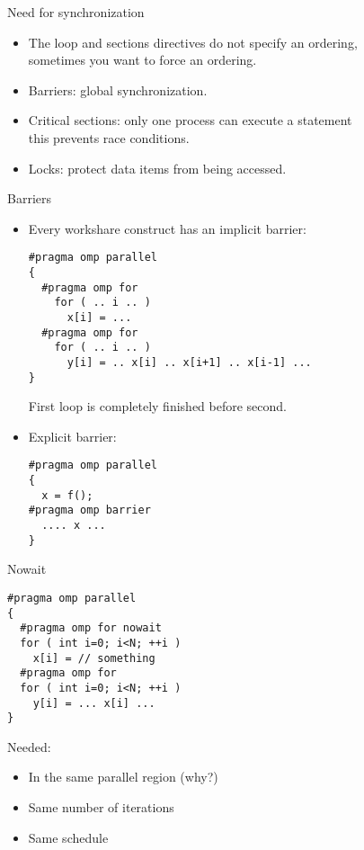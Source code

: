 
\begin{numberedframe}{Need for synchronization}
  \begin{itemize}
  \item The loop and sections directives do not specify an ordering,\\
    sometimes you want to force an ordering.
  \item Barriers: global synchronization.
  \item Critical sections: only one process can execute a statement\\
    this prevents race conditions.
  \item Locks: protect data items from being accessed.
  \end{itemize}
\end{numberedframe}

\begin{numberedframe}{Barriers}
\small
  \begin{itemize}
  \item Every workshare construct has an implicit barrier:
\begin{verbatim}
#pragma omp parallel
{
  #pragma omp for
    for ( .. i .. )
      x[i] = ...
  #pragma omp for
    for ( .. i .. )
      y[i] = .. x[i] .. x[i+1] .. x[i-1] ...
}
\end{verbatim}
First loop is completely finished before second.
\item Explicit barrier:
\begin{verbatim}
#pragma omp parallel
{
  x = f();
#pragma omp barrier
  .... x ...
}
\end{verbatim}
  \end{itemize}
\end{numberedframe}

\begin{numberedframe}{Nowait}
\begin{lstlisting}
#pragma omp parallel
{
  #pragma omp for nowait
  for ( int i=0; i<N; ++i )
    x[i] = // something
  #pragma omp for
  for ( int i=0; i<N; ++i )
    y[i] = ... x[i] ...
}
\end{lstlisting}
Needed:
  \begin{itemize}
  \item In the same parallel region (why?)
  \item Same number of iterations
  \item Same schedule
  \end{itemize}
\end{numberedframe}


